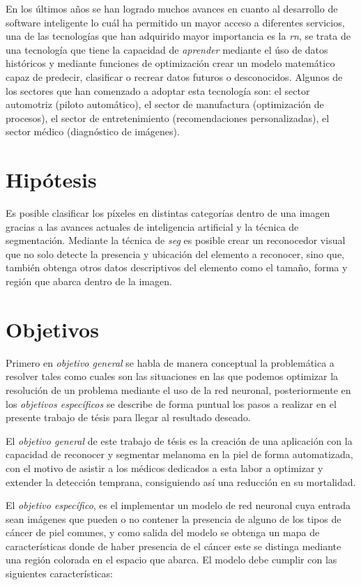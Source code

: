 En los últimos años se han logrado muchos avances en cuanto al desarrollo de software inteligente lo cuál ha permitido un mayor acceso a diferentes servicios, una de las tecnologías que han adquirido mayor importancia es la \emph{\gls{rn}}, se trata de una tecnología que tiene la capacidad de \emph{aprender} mediante el úso de datos históricos y mediante funciones de optimización crear un modelo matemático capaz de predecir, clasificar o recrear datos futuros o desconocidos. Algunos de los sectores que han comenzado a adoptar esta tecnología son: el sector automotriz (piloto automático), el sector de manufactura (optimización de procesos), el sector de entretenimiento (recomendaciones personalizadas), el sector médico (diagnóstico de imágenes). 


\section{Hipótesis}
Es posible clasificar los píxeles en distintas categorías dentro de una imagen gracias a las avances actuales de inteligencia artificial y la técnica de segmentación. Mediante la técnica de \emph{\gls{seg}} es posible crear un reconocedor visual que no solo detecte la presencia y ubicación del elemento a reconocer, sino que, también obtenga otros datos descriptivos del elemento como el tamaño, forma y región que abarca dentro de la imagen.

\section{Objetivos}
Primero en \emph{objetivo general} se habla de manera conceptual la problemática a resolver tales como cuales son las situaciones en las que podemos optimizar la resolución de un problema mediante el uso de la red neuronal, posteriormente en los \emph{objetivos específicos} se describe de forma puntual los pasos a realizar en el presente trabajo de tésis para llegar al resultado deseado.

El \emph{objetivo general} de este trabajo de tésis es la creación de una aplicación con la capacidad de reconocer y segmentar melanoma en la piel de forma automatizada, con el motivo de asistir a los médicos dedicados a esta labor a optimizar y extender la detección temprana, consiguiendo así una reducción en su mortalidad.

El \emph{objetivo específico}, es el implementar un modelo de red neuronal cuya entrada sean imágenes que pueden o no contener la presencia de alguno de los tipos de cáncer de piel comunes, y como salida del modelo se obtenga un mapa de características donde de haber presencia de el cáncer este se distinga mediante una región colorada en el espacio que abarca. El modelo debe cumplir con las siguientes características:


